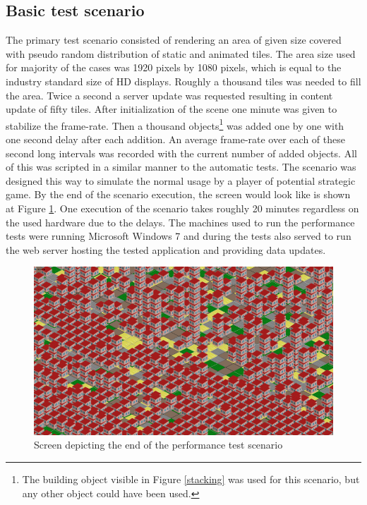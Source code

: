\documentclass[11pt,oneside, final]{fithesis2}
\begin{document}
\subsection{Basic test scenario}
The primary test scenario consisted of rendering an area of given size covered with pseudo random distribution of static and animated tiles. The area size used for majority of the cases was 1920 pixels by 1080 pixels, which is equal to the industry standard size of HD displays. Roughly a thousand tiles was needed to fill the area. Twice a second a server update was requested resulting in content update of fifty tiles. After initialization of the scene one minute was given to stabilize the frame-rate. Then a thousand objects\footnote{The building object visible in Figure \ref{stacking} was used for this scenario, but any other object could have been used.} was added one by one with one second delay after each addition. An average frame-rate over each of these second long intervals was recorded with the current number of added objects. All of this was scripted in a similar manner to the automatic tests. The scenario was designed this way to simulate the normal usage by a player of potential strategic game. By the end of the scenario execution, the screen would look like is shown at Figure \ref{performance-finish}. One execution of the scenario takes roughly 20 minutes regardless on the used hardware due to the delays. The machines used to run the performance tests were running Microsoft Windows 7 and during the tests also served to run the web server hosting the tested application and providing data updates.

\begin{figure}[h]
	\centering
	\includegraphics[width=\textwidth]{thesis-performance-finish}
	\caption{Screen depicting the end of the performance test scenario}
	\label{performance-finish}
\end{figure}
\end{document}
